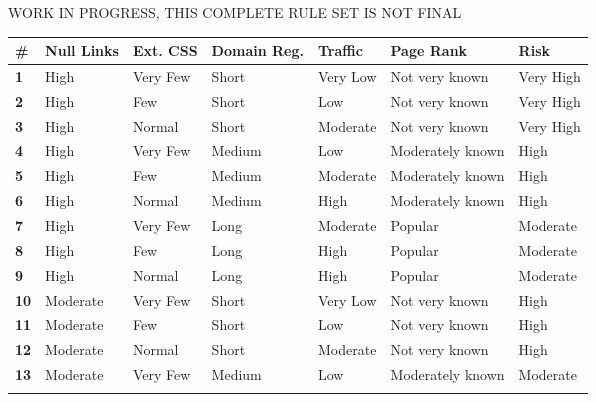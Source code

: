 \documentclass{article}
\begin{document}
WORK IN PROGRESS, THIS COMPLETE RULE SET IS NOT FINAL

\begin{table}[H]
\centering
\footnotesize
\setlength{\extrarowheight}{1pt}
\begin{tabularx}{\textwidth}{|>{\centering\arraybackslash}p{}|>{\raggedright\arraybackslash}p{}|>{\raggedright\arraybackslash}p{}|>{\raggedright\arraybackslash}p{}|>{\raggedright\arraybackslash}p{}|>{\raggedright\arraybackslash}p{}|>{\raggedright\arraybackslash}p{}|}
\hline
\rowcolor{gray!30}
\textbf{\#} & \textbf{Null Links} & \textbf{Ext. CSS} & \textbf{Domain Reg.} & \textbf{Traffic} & \textbf{Page Rank} & \textbf{Risk} \\ \hline
\textbf{1}  & High      & Very Few & Short  & Very Low    & Not very known   & Very High     \\\rowcolor{lightgray}
\textbf{2}  & High      & Few      & Short  & Low         & Not very known   & Very High     \\
\textbf{3}  & High      & Normal   & Short  & Moderate    & Not very known   & Very High     \\\rowcolor{lightgray}
\textbf{4}  & High      & Very Few & Medium & Low         & Moderately known & High          \\
\textbf{5}  & High      & Few      & Medium & Moderate    & Moderately known & High          \\\rowcolor{lightgray}
\textbf{6}  & High      & Normal   & Medium & High        & Moderately known & High          \\
\textbf{7}  & High      & Very Few & Long   & Moderate    & Popular          & Moderate      \\\rowcolor{lightgray}
\textbf{8}  & High      & Few      & Long   & High        & Popular          & Moderate      \\
\textbf{9}  & High      & Normal   & Long   & High        & Popular          & Moderate      \\\rowcolor{lightgray}
\textbf{10} & Moderate  & Very Few & Short  & Very Low    & Not very known   & High          \\
\textbf{11} & Moderate  & Few      & Short  & Low         & Not very known   & High          \\\rowcolor{lightgray}
\textbf{12} & Moderate  & Normal   & Short  & Moderate    & Not very known   & High          \\
\textbf{13} & Moderate  & Very Few & Medium & Low         & Moderately known & Moderate      \\\rowcolor{lightgray}

\end{tabularx}
\end{table}
\end{document}
